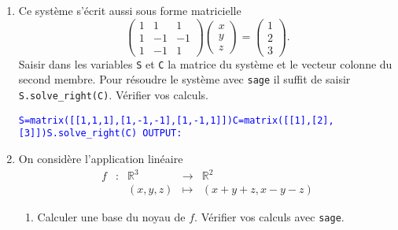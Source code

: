 \documentclass[a4paper,12pt]{article}
\def\R{\mathbb{R}}
\newcommand{\add}[1]{\textcolor{blue}{#1}}
\begin{document}
\begin{exercice}
\begin{enumerate}
$${\begin{aligned}
                      y&=-1&L_3
                \end{aligned}
            \right.
            \iff
            \left\{
                \begin{aligned}
                    x&=\frac{3}{2} &L_1\\
                      y&=-1&L_3\\
                      z&=\frac{1}{2}&L_2
                \end{aligned}
            \right.
            }
            $$

        \item Ce système s'écrit aussi sous forme matricielle 
            $$\left(
                    \begin{array}{ccc}
                    1 & 1 & 1 \\
                    1 & -1 & -1 \\
                    1 & -1 & 1 
                \end{array}
              \right)
              \left(
                    \begin{array}{c}
                    x \\ y \\ z 
                \end{array}
              \right)
              =
              \left(
                    \begin{array}{c}
                    1 \\ 2 \\ 3 
                \end{array}
              \right).
              $$
              Saisir dans les variables {\tt S} et {\tt C} la matrice du système et le vecteur colonne du second membre.
              Pour résoudre le système avec {\tt sage} il suffit de saisir {\tt S.solve\_right(C)}. Vérifier vos calculs.

              \add{
                  {\tt S=matrix([[1,1,1],[1,-1,-1],[1,-1,1]])\newline C=matrix([[1],[2],[3]])\newline S.solve\_right(C)\newline\newline
                  OUTPUT:\newline
                  [3/2]\newline
                  [ -1]\newline
                  [1/2]
                  }
            }
          \item On considère l'application linéaire
              $$\begin{array}{ccccc}
                  f & : & \R^3 & \to & \R^2 \\
                    &   & (x,y,z) & \mapsto & (x+y+z,x-y-z)
                \end{array}
              $$
              \begin{enumerate}
                  \item Calculer une base du noyau de $f$. Vérifier vos calculs avec {\tt sage}.


\end{enumerate}
\end{enumerate}
\end{exercice}
\end{document}
